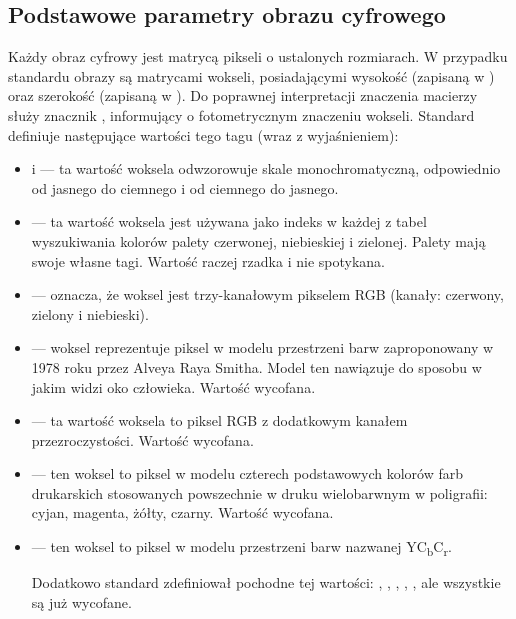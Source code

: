 \subsection{Podstawowe parametry obrazu cyfrowego}

\dicomtagExplanations

\par
Każdy obraz cyfrowy jest matrycą pikseli o ustalonych rozmiarach.
W przypadku standardu \DICOM obrazy są matrycami wokseli, posiadającymi wysokość (zapisaną w ) oraz szerokość (zapisaną w ).
Do poprawnej interpretacji znaczenia macierzy służy znacznik , informujący o fotometrycznym znaczeniu wokseli.
Standard \DICOM definiuje następujące wartości tego tagu (wraz z wyjaśnieniem):
\begin{itemize}
    \item {} i  --- ta wartość woksela odwzorowuje skale monochromatyczną, odpowiednio od jasnego do ciemnego i od ciemnego do jasnego.

    \item {} --- ta wartość woksela jest używana jako indeks w każdej z tabel wyszukiwania kolorów palety czerwonej, niebieskiej i zielonej.
          Palety mają swoje własne tagi.
          Wartość raczej rzadka i nie spotykana.

    \item {} --- oznacza, że woksel jest trzy-kanałowym pikselem RGB (kanały: czerwony, zielony i niebieski).

    \item {}  --- woksel reprezentuje piksel w modelu przestrzeni barw zaproponowany w 1978 roku przez Alveya Raya Smitha.
          Model ten nawiązuje do sposobu w jakim widzi oko człowieka.
          Wartość wycofana.

    \item {} --- ta wartość woksela to piksel RGB z dodatkowym kanałem przezroczystości.
          Wartość wycofana.

    \item {} --- ten woksel to piksel w modelu czterech podstawowych kolorów farb drukarskich stosowanych powszechnie w druku wielobarwnym w poligrafii: cyjan, magenta, żółty, czarny.
          Wartość wycofana.

    \item {} --- ten woksel to piksel w modelu przestrzeni barw nazwanej YC\textsubscript{b}C\textsubscript{r}.

          Dodatkowo standard zdefiniował pochodne tej wartości: , , , , , ale wszystkie są już wycofane.
\end{itemize}

